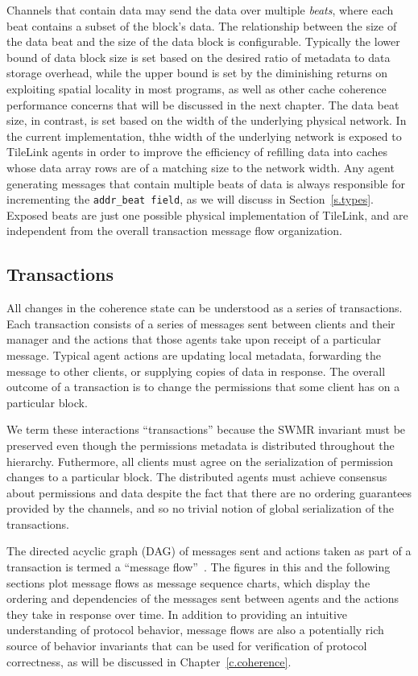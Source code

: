 Channels that contain data may send the data over multiple {\em beats}, where each beat contains a subset of the block's data.
The relationship between the size of the data beat and the size of the data block is configurable.
Typically the lower bound of data block size is set based on
the desired ratio of metadata to data storage overhead,
while the upper bound is set by the diminishing returns on exploiting spatial locality in most programs,
as well as other cache coherence performance concerns that will be discussed in the next chapter.
The data beat size, in contrast, is set based on the width of the underlying physical network.
In the current implementation, thhe width of the underlying network is exposed to TileLink agents in order to
improve the efficiency of refilling data into caches whose data array rows are of a matching size to the network width.
Any agent generating messages that contain multiple beats of data is always responsible for incrementing the {\tt addr\_beat field}, as we will discuss in Section~\ref{s.types}.
Exposed beats are just one possible physical implementation of TileLink, and are independent from the overall transaction message flow organization.

\subsection{Transactions}

All changes in the coherence state can be understood as a series of transactions.
Each transaction consists of a series of messages sent between clients and their manager
and the actions that those agents take upon receipt of a particular message.
Typical agent actions are updating local metadata, forwarding the message to other clients, or supplying copies of data in response.
The overall outcome of a transaction is to change the permissions that some client has on a particular block.

We term these interactions ``transactions'' because the SWMR invariant must be preserved even though the permissions metadata is distributed throughout the hierarchy.
Futhermore, all clients must agree on the serialization of permission changes to a particular block.
The distributed agents must achieve consensus about permissions and data despite the fact that there are no ordering guarantees
provided by the channels, and so no trivial notion of global serialization of the transactions.

The directed acyclic graph (DAG) of messages sent and actions taken as part of a transaction is termed a ``message flow''~\cite{talupur2008going}.
The figures in this and the following sections plot message flows as message sequence charts,
which display the ordering and dependencies of the messages sent between agents and the actions they take in response over time.
In addition to providing an intuitive understanding of protocol behavior, message flows are also a potentially
rich source of behavior invariants that can be used for verification of protocol correctness, as will be discussed in Chapter~\ref{c.coherence}.

